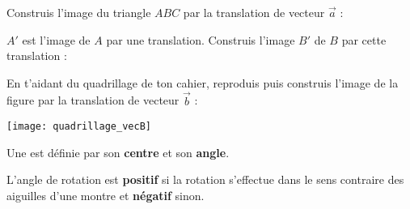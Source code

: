 \begin{methode*1}[La translation]

 \begin{exemple*1}
Construis l'image du triangle $ABC$ par la translation de vecteur $\vec{a}$ :
 \end{exemple*1}
 
 \begin{exemple*1}
$A'$ est l'image de $A$ par une translation. Construis l'image $B'$ de $B$ par cette translation :
 \end{exemple*1}

 \exercice
En t'aidant du quadrillage de ton cahier, reproduis puis construis l'image de la figure par la translation de vecteur $\vec{b}$ :
\begin{center} \texttt{[image: quadrillage\_vecB]} \end{center}

 \end{methode*1}
 

\begin{aconnaitre}
Une  est définie par son \textbf{centre} et son \textbf{angle}.

L'angle de rotation est \textbf{positif} si la rotation s'effectue dans le sens contraire des aiguilles d'une montre et \textbf{négatif} sinon.
\end{aconnaitre}

